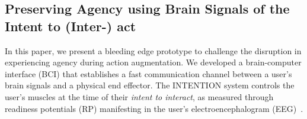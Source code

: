 
\subsection{Preserving Agency using Brain Signals of the Intent to (Inter-) act}
In this paper, we present a bleeding edge prototype to challenge the disruption in experiencing agency during action augmentation. We developed a brain-computer interface (BCI) that establishes a fast communication channel between a user's brain signals and a physical end effector. The  INTENTION system controls the user's muscles at the time of their \textit{intent to interact}, as measured through readiness potentials (RP) manifesting in the user's electroencephalogram (EEG)~\cite{Nguyen2023-me, Schurger2021-vp, Schultze-Kraft2016-bx, Schultze-Kraft2021-cu}. 


